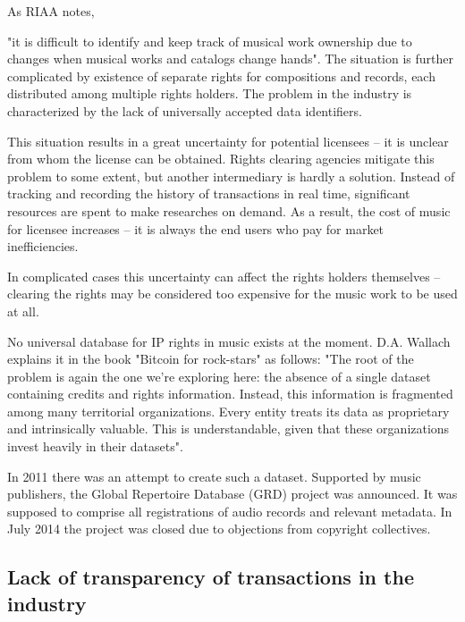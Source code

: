 \documentclass[12pt]{report}
\begin{document}
As RIAA notes, 
\begin{framed}
\begin{multicols}{2}
"it is difficult to identify and keep track of musical work ownership due to changes when musical works and catalogs change hands". The situation is further complicated by existence of separate rights for compositions and records, each distributed among multiple rights holders. The problem in the industry is characterized by the lack of universally accepted data identifiers.
 
This situation results in a great uncertainty for potential licensees – it is unclear from whom the license can be obtained. Rights clearing agencies mitigate this problem to some extent, but another intermediary is hardly a solution. Instead of tracking and recording the history of transactions in real time, significant resources are spent to make researches on demand. As a result, the cost of music for licensee increases – it is always the end users who pay for market inefficiencies.
 
In complicated cases this uncertainty can affect the rights holders themselves – clearing the rights may be considered too expensive for the music work to be used at all.
 
No universal database for IP rights in music exists at the moment. D.A. Wallach explains it in the book "Bitcoin for rock-stars" as follows: "The root of the problem is again the one we’re exploring here: the absence of a single dataset containing credits and rights information. Instead, this information is fragmented among many territorial organizations. Every entity treats its data as proprietary and intrinsically valuable. This is understandable, given that these organizations invest heavily in their datasets".
\end{multicols}
\end{framed}
 
In 2011 there was an attempt to create such a dataset. Supported by music publishers, the Global Repertoire Database (GRD) project was announced. It was supposed to comprise all registrations of audio records and relevant metadata. In July 2014 the project was closed due to objections from copyright collectives.
\vfill\null\pagebreak

\subsection{Lack of transparency of transactions in the industry}
\end{document}
